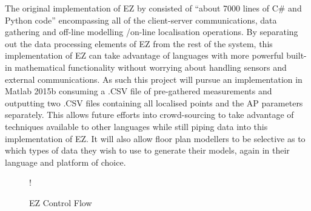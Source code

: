 \documentclass{UoYCSproject}
\begin{document}
            The original implementation of EZ by \citeauthor{chintalapudi2010indoor} consisted of ``about 7000 lines of C\# and Python code'' encompassing all of the client-server communications, data gathering and off-line modelling /on-line localisation operations. By separating out the data processing elements of EZ from the rest of the system, this implementation of EZ can take advantage of languages with more powerful built-in mathematical functionality without worrying about handling sensors and external communications. As such this project will pursue an implementation in Matlab 2015b consuming a .CSV file of pre-gathered measurements and outputting two .CSV files containing all localised points and the AP parameters separately. This allows future efforts into crowd-sourcing to take advantage of techniques available to other languages while still piping data into this implementation of EZ. It will also allow floor plan modellers to be selective as to which types of data they wish to use to generate their models, again in their language and platform of choice.
            
            \begin{figure}[h]
            \label{fig:EZControl}
            \centering
            \resizebox {\textwidth} {!} {
	        }
            \caption{EZ Control Flow}
	        \end{figure}
            
\end{document}

